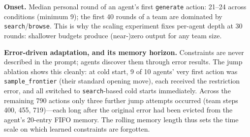 \documentclass{article} %
\begin{document}
\textbf{Onset.} Median personal round of an agent's first
\texttt{generate} action: 21--24 across conditions (minimum 9); the
first 40 rounds of a team are dominated by
\texttt{search}/\texttt{browse}. This is why the scaling experiment
fixes per-agent depth at 30 rounds: shallower budgets produce
(near-)zero output for any team size.

\textbf{Error-driven adaptation, and its memory horizon.} Constraints
are never described in the prompt; agents discover them through error
results. The jump ablation shows this cleanly: at cold start, 9 of 10
agents' very first action was \texttt{sample\_frontier} (their standard
opening move), each received the restriction error, and all switched to
\texttt{search}-based cold starts immediately. Across the remaining 790
actions only three further jump attempts occurred (team steps 400, 455,
719)---each long after the original error had been evicted from the
agent's 20-entry FIFO memory. The rolling memory length thus sets the
time scale on which learned constraints are forgotten.
\end{document}
